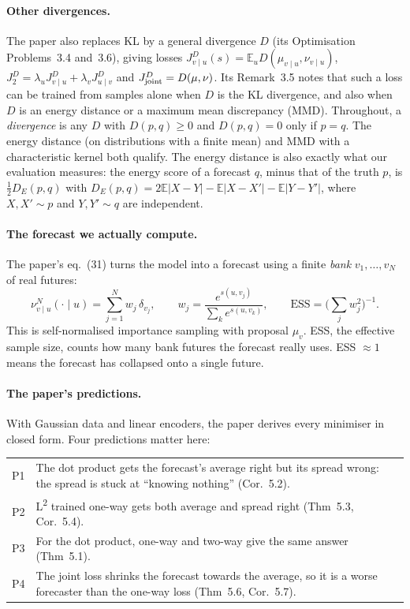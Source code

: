 \documentclass[11pt]{article}
\newcommand{\Ltwo}{L\textsuperscript{2}}
\newcommand{\E}{\mathbb{E}}
\newcommand{\vu}{{v\mid u}}
\newcommand{\uv}{{u\mid v}}
\theoremstyle{plain}
\theoremstyle{definition}
\theoremstyle{remark}
\begin{document}
\paragraph{Other divergences.} The paper also replaces KL by a general divergence $D$
(its Optimisation Problems~3.4 and~3.6), giving losses $J^D_\vu(s)=\E_u D(\mu_\vu,\nu_\vu)$,
$J^D_2=\lambda_uJ^D_\vu+\lambda_vJ^D_\uv$ and $J^D_{\rm joint}=D(\mu,\nu)$. Its Remark~3.5 notes that
such a loss can be trained from samples alone when $D$ is the KL divergence, and also when
$D$ is an energy distance or a maximum mean discrepancy (MMD). Throughout, a \emph{divergence}
is any $D$ with $D(p,q)\ge0$ and $D(p,q)=0$ only if $p=q$. The energy distance (on distributions
with a finite mean) and MMD with a characteristic kernel both qualify. The energy distance
is also exactly what our evaluation measures: the energy score of a forecast $q$, minus that
of the truth $p$, is $\frac12 D_E(p,q)$ with
$D_E(p,q)=2\E|X-Y|-\E|X-X'|-\E|Y-Y'|$, where $X,X'\sim p$ and $Y,Y'\sim q$ are independent.

\paragraph{The forecast we actually compute.} The paper's eq.~(31) turns the model into a
forecast using a finite \emph{bank} $v_1,\dots,v_N$ of real futures:
\[
  \nu^N_\vu(\cdot\mid u) = \sum_{j=1}^N w_j\,\delta_{v_j},\qquad
  w_j = \frac{e^{s(u,v_j)}}{\sum_k e^{s(u,v_k)}},\qquad
  \mathrm{ESS} = \Big(\sum_j w_j^2\Big)^{-1}.
\]
This is self-normalised importance sampling with proposal $\mu_v$. ESS, the effective
sample size, counts how many bank futures the forecast really uses. ESS $\approx1$ means the
forecast has collapsed onto a single future.

\paragraph{The paper's predictions.} With Gaussian data and linear encoders, the paper
derives every minimiser in closed form. Four predictions matter here:
\begin{center}\small
\begin{tabularx}{\textwidth}{@{}lL@{}}
\toprule
P1 & The dot product gets the forecast's average right but its spread wrong: the spread is
     stuck at ``knowing nothing'' (Cor.~5.2). \\
P2 & \Ltwo{} trained one-way gets both average and spread right (Thm~5.3, Cor.~5.4). \\
P3 & For the dot product, one-way and two-way give the same answer (Thm~5.1). \\
P4 & The joint loss shrinks the forecast towards the average, so it is a worse forecaster
     than the one-way loss (Thm~5.6, Cor.~5.7). \\
\bottomrule
\end{tabularx}
\end{center}
\end{document}
